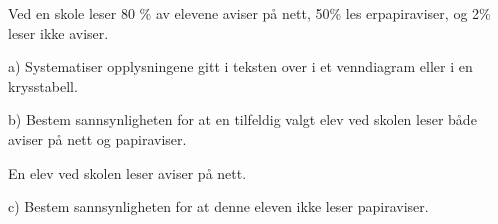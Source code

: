 Ved en skole leser 80 \% av elevene aviser på nett, 50\% les erpapiraviser, og 2\% leser ikke
aviser. \os

a) Systematiser opplysningene gitt i teksten over i et venndiagram eller i en
krysstabell. \os

b) Bestem sannsynligheten for at en tilfeldig valgt elev ved skolen leser både aviser på nett og papiraviser.\os

En elev ved skolen leser aviser på nett.\os

c) Bestem sannsynligheten for at denne eleven ikke leser papiraviser.





